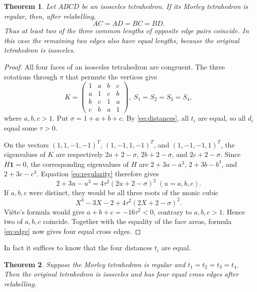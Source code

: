 \documentclass[11pt]{article}
\newtheorem{theorem}{Theorem}[section]
\theoremstyle{definition}
\theoremstyle{remark}
\newcommand{\one}{\mathbf 1}
\begin{document}
\begin{theorem}
\label{thm:disphenoid}
Let $ABCD$ be an isosceles tetrahedron. If its Morley tetrahedron is regular, then, after relabelling,
\[
AC=AD=BC=BD.
\]
Thus at least two of the three common lengths of opposite edge pairs coincide. In this case the remaining two edges also have equal lengths, because the original tetrahedron is isosceles.
\end{theorem}

\begin{proof}
All four faces of an isosceles tetrahedron are congruent. The three rotations through $\pi$ that permute the vertices give
\[
K=\begin{pmatrix}
1&a&b&c\\ a&1&c&b\\ b&c&1&a\\ c&b&a&1
\end{pmatrix},\; S_1=S_2=S_3=S_4,
\]
where $a,b,c>1$. Put $\sigma=1+a+b+c$. By \eqref{eq:distances}, all $t_i$ are equal, so all $d_i$ equal some $\tau>0$.

On the vectors $(1,1,-1,-1)^T$, $(1,-1,1,-1)^T$, and $(1,-1,-1,1)^T$, the eigenvalues of $K$ are respectively $2a+2-\sigma$, $2b+2-\sigma$, and $2c+2-\sigma$. Since $H\one=0$, the corresponding eigenvalues of $H$ are $2+3a-a^3$, $2+3b-b^3$, and $2+3c-c^3$. Equation \eqref{eq:regularity} therefore gives
\[
2+3u-u^3=4\tau^2(2u+2-\sigma)^2
\;(u=a,b,c).
\]
If $a,b,c$ were distinct, they would be all three roots of the monic cubic
\[
X^3-3X-2+4\tau^2(2X+2-\sigma)^2.
\]
Vi\`ete's formula would give $a+b+c=-16\tau^2<0$, contrary to $a,b,c>1$. Hence two of $a,b,c$ coincide. Together with the equality of the face areas, formula \eqref{eq:edge} now gives four equal cross edges.
\end{proof}

In fact it suffices to know that the four distances $t_i$ are equal.

\begin{theorem}
\label{thm:equaldistances}
Suppose the Morley tetrahedron is regular and $t_1=t_2=t_3=t_4$. Then the original tetrahedron is isosceles and has four equal cross edges after relabelling.
\end{theorem}
\end{document}
